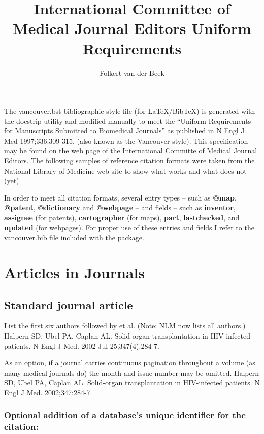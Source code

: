 \documentclass[a4paper,10pt]{article}
\title{International Committee of Medical Journal Editors Uniform Requirements}
\author{Folkert van der Beek}
\begin{document}
\maketitle
The vancouver.bst bibliographic style file (for \LaTeX/Bib\TeX) is generated with the docstrip utility and modified manually to meet the ``Uniform Requirements for Manuscripts Submitted to Biomedical Journals'' as published in N Engl J Med 1997;336:309-315. (also known as the Vancouver style). This specification may be found on the web page of the International Committe of Medical Journal Editors.\cite{uniform}
The following samples of reference citation formats were taken from the National Library of Medicine web site to show what works and what does not (yet).\cite{bibliographic}

In order to meet all citation formats, several entry types {--} such as \textbf{@map}, \textbf{@patent}, \textbf{@dictionary} and \textbf{@webpage} {--} and fields {--} such as \textbf{inventor}, \textbf{assignee} (for patents), \textbf{cartographer} (for maps), \textbf{part}, \textbf{lastchecked}, and \textbf{updated} (for webpages). For proper use of these entries and fields I refer to the vancouver.bib file included with the package.

\section{Articles in Journals}

\subsection{Standard journal article}

List the first six authors followed by et al. (Note: NLM now lists all authors.)
\linebreak
Halpern SD, Ubel PA, Caplan AL. Solid-organ transplantation in HIV-infected patients. N Engl J Med. 2002 Jul 25;347(4):284-7.\cite{halpern.ubel.ea:solid-organ*2}


As an option, if a journal carries continuous pagination throughout a volume (as many medical journals do) the month and issue number may be omitted.
\linebreak
Halpern SD, Ubel PA, Caplan AL. Solid-organ transplantation in HIV-infected patients. N Engl J Med. 2002;347:284-7.\cite{halpern.ubel.ea:solid-organ}

\subsubsection{Optional addition of a database's unique identifier for the citation:}
\end{document}
